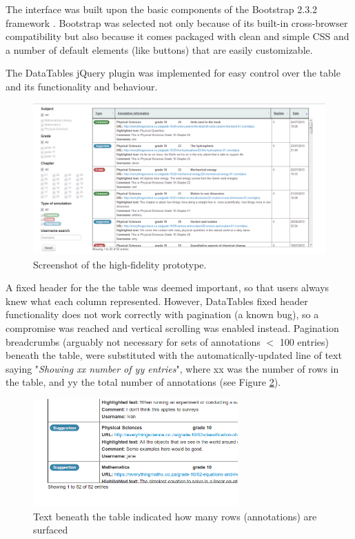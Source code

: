 The interface was built upon the basic components of the Bootstrap 2.3.2 framework \citep{Bootstrap}. Bootstrap was selected not only because of its built-in cross-browser compatibility but also because it comes packaged with clean and simple CSS and a number of default elements (like buttons) that are easily customizable. 

The DataTables jQuery plugin \citep{DataTables} was implemented for easy control over the table and its functionality and behaviour. 

\begin{figure}
    \centering
    \includegraphics[width=\textwidth]{Figures/V1/HiFi1mainview.PNG}
 \caption{Screenshot of the high-fidelity prototype.}
 \label{fig:HifiMain}
\end{figure}

A fixed header for the the table was deemed important, so that users always knew what each column represented. However, DataTables fixed header functionality does not work correctly with pagination (a known bug), so a compromise was reached and vertical scrolling was enabled instead. Pagination breadcrumbs (arguably not necessary for sets of annotations $<$ 100 entries) beneath the table, were substituted with the automatically-updated line of text saying "\textit{Showing xx number of yy entries}", where xx was the number of rows in the table, and yy the total number of annotations (see Figure \ref{fig:breadcrumbs}).

\begin{figure}[h!]
    \centering
    \includegraphics[width=0.7\textwidth]{Figures/V1/breadcrumbs.png}
 \caption{Text beneath the table indicated how many rows (annotations) are surfaced}
 \label{fig:breadcrumbs}
\end{figure}

